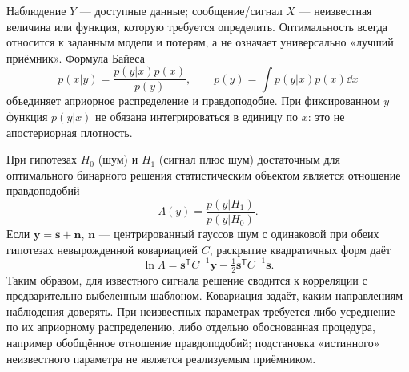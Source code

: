 
Наблюдение $Y$ — доступные данные; сообщение/сигнал $X$ — неизвестная величина или функция, которую требуется определить. Оптимальность всегда относится к заданным модели и потерям, а не означает универсально «лучший приёмник». Формула Байеса
\begin{equation}
 p(x|y)=\frac{p(y|x)p(x)}{p(y)},\qquad
 p(y)=\int p(y|x)p(x)\dd x
\end{equation}
объединяет априорное распределение и правдоподобие. При фиксированном $y$ функция $p(y|x)$ не обязана интегрироваться в единицу по $x$: это не апостериорная плотность.

При гипотезах $H_0$ (шум) и $H_1$ (сигнал плюс шум) достаточным для оптимального бинарного решения статистическим объектом является отношение правдоподобий
\begin{equation}
 \Lambda(y)=\frac{p(y|H_1)}{p(y|H_0)}.
\end{equation}
Если $\bm y=\bm s+\bm n$, $\bm n$ — центрированный гауссов шум с одинаковой при обеих гипотезах невырожденной ковариацией $C$, раскрытие квадратичных форм даёт
\begin{equation}
 \ln\Lambda=\bm s^{\mathsf T}C^{-1}\bm y-
 \tfrac12\bm s^{\mathsf T}C^{-1}\bm s.
\end{equation}
Таким образом, для известного сигнала решение сводится к корреляции с предварительно выбеленным шаблоном. Ковариация задаёт, каким направлениям наблюдения доверять. При неизвестных параметрах требуется либо усреднение по их априорному распределению, либо отдельно обоснованная процедура, например обобщённое отношение правдоподобий; подстановка «истинного» неизвестного параметра не является реализуемым приёмником.
